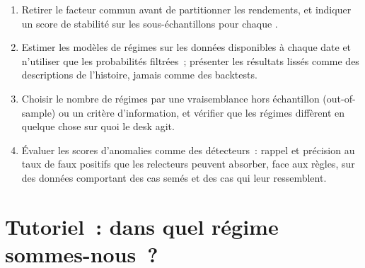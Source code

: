 \begin{method}\label{met:ml:reg:method}
\begin{enumerate}
\item Retirer le facteur commun avant de partitionner les rendements, et indiquer un score de stabilité sur les sous-échantillons pour chaque
.
\item Estimer les modèles de régimes sur les données disponibles à chaque date et n'utiliser que les probabilités filtrées~; présenter les résultats lissés comme
des descriptions de l'histoire, jamais comme des backtests.
\item Choisir le nombre de régimes par une vraisemblance hors échantillon (out-of-sample) ou un critère d'information, et vérifier que les régimes diffèrent
en quelque chose sur quoi le desk agit.
\item Évaluer les scores d'anomalies comme des détecteurs~: rappel et précision au taux de faux positifs que les relecteurs
peuvent absorber, face aux règles, sur des données comportant des cas semés et des cas qui leur ressemblent.
\end{enumerate}
\end{method}

\section{Tutoriel~: dans quel régime sommes-nous~?}\label{tut:ml:clustering-regimes-and-anomaly-detection:tut}

